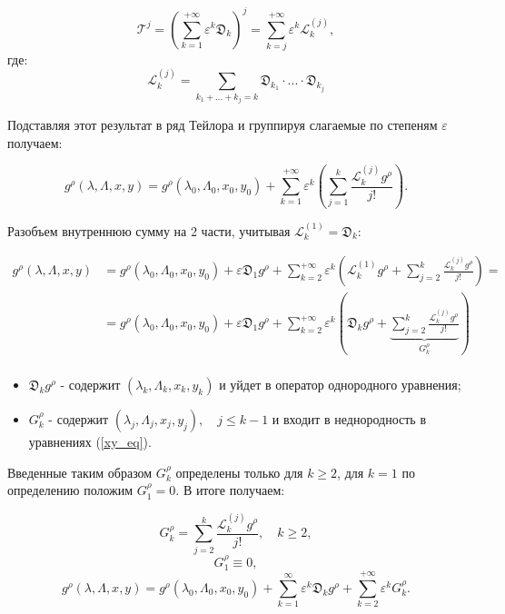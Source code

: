 \begin{enumerate}
$$\mathcal{T}^j = \left( \sum_{k=1}^{+\infty} \varepsilon^k \mathfrak{D}_k \right)^j = \sum_{k=j}^{+\infty} \varepsilon^k \mathcal{L}_k^{(j)},$$
где:
$$\mathcal{L}_k^{(j)} = \sum_{k_1+...+k_j = k} \mathfrak{D}_{k_1} \cdot ... \cdot \mathfrak{D}_{k_j}$$

Подставляя этот результат в ряд Тейлора и группируя слагаемые по степеням $\varepsilon$ получаем:

$$g^\rho(\lambda,\Lambda,x,y) = g^\rho(\lambda_0,\Lambda_0,x_0,y_0) + \sum_{k=1}^{+\infty} \varepsilon^k \left( \sum_{j=1}^k \frac{\mathcal{L}_k^{(j)} g^\rho}{j!} \right).$$


Разобъем внутреннюю сумму на 2 части, учитывая $\mathcal{L}_k^{(1)} = \mathfrak{D}_k$:

\begin{equation*}
\begin{aligned}
g^\rho(\lambda,\Lambda,x,y) 
    &= g^\rho(\lambda_0,\Lambda_0,x_0,y_0) + \varepsilon \mathfrak{D}_1 g^\rho + \sum_{k=2}^{+\infty} \varepsilon^k \left( \mathcal{L}_k^{(1)}g^\rho + \sum_{j=2}^k \frac{\mathcal{L}_k^{(j)} g^\rho}{j!} \right) = \\ 
    &= g^\rho(\lambda_0,\Lambda_0,x_0,y_0) + \varepsilon \mathfrak{D}_1 g^\rho + \sum_{k=2}^{+\infty} \varepsilon^k \left( \mathfrak{D}_k g^\rho + \underbrace{\sum_{j=2}^k \frac{\mathcal{L}_k^{(j)} g^\rho}{j!}}_{G_k^\rho} \right) \\ 
\end{aligned}
\end{equation*}

\begin{itemize}
\item $\mathfrak{D}_k g^\rho$ - содержит $(\lambda_k, \Lambda_k, x_k, y_k)$ и уйдет в оператор однородного уравнения;
\item $G_k^\rho$ - содержит $(\lambda_j, \Lambda_j, x_j, y_j), \quad j \le k-1$ и входит в неднородность в уравнениях (\ref{xy_eq}).
\end{itemize}

Введенные таким образом $G_k^\rho$ определены только для $k \ge 2$, для $k=1$ по определению положим $G_1^\rho = 0$. В итоге получаем:

\begin{equation}
G_k^\rho = \sum_{j=2}^{k} \frac{\mathcal{L}_k^{(j)} g^\rho }{j!}, \quad k \ge 2,
\label{G_def}
\end{equation}
$$G_1^\rho \equiv 0,$$
$$g^\rho(\lambda,\Lambda,x,y) = g^\rho(\lambda_0,\Lambda_0,x_0,y_0) + \sum_{k=1}^{\infty} \varepsilon^k \mathfrak{D}_k g^\rho + \sum_{k=2}^{+\infty} \varepsilon^k G_k^\rho.$$


\end{enumerate}
